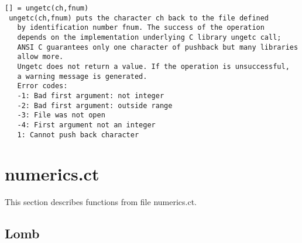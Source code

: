 \documentclass[a4paper]{article}
\begin{document}
\begin{tscreen}
\begin{verbatim}
[] = ungetc(ch,fnum)
 ungetc(ch,fnum) puts the character ch back to the file defined
   by identification number fnum. The success of the operation
   depends on the implementation underlying C library ungetc call;
   ANSI C guarantees only one character of pushback but many libraries
   allow more.
   Ungetc does not return a value. If the operation is unsuccessful,
   a warning message is generated.
   Error codes:
   -1: Bad first argument: not integer
   -2: Bad first argument: outside range
   -3: File was not open
   -4: First argument not an integer
   1: Cannot push back character
\end{verbatim}
\end{tscreen}





\section{numerics.ct}

This section describes functions from file numerics.ct.




\subsection{Lomb\label{Lomb}}
\end{document}
